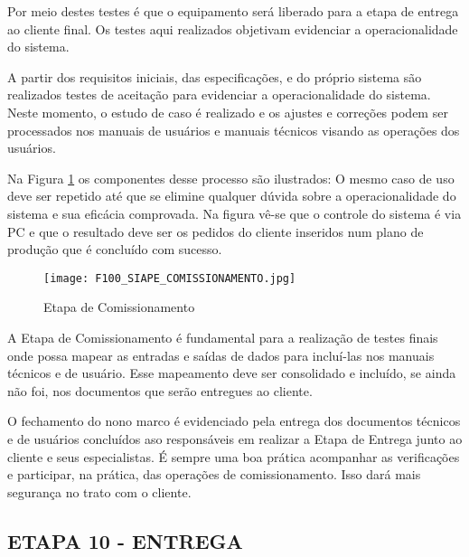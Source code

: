 Por meio destes testes é que o equipamento será liberado para a etapa de entrega ao cliente final. Os testes aqui realizados objetivam evidenciar a operacionalidade do sistema. \par
A partir dos requisitos iniciais, das especificações, e do próprio sistema são realizados testes de aceitação para evidenciar a operacionalidade do sistema. Neste momento, o estudo de caso é realizado e os ajustes e correções podem ser processados nos manuais de usuários e manuais técnicos visando as operações dos usuários.    

Na Figura \ref{F100} os componentes desse processo são ilustrados: O mesmo caso de uso deve ser repetido até que se elimine qualquer dúvida sobre a operacionalidade do sistema e sua eficácia comprovada. Na figura vê-se que o controle do sistema é via PC e que o resultado deve ser os pedidos do cliente inseridos num plano de produção que é concluído com sucesso. 

\begin{figure}[h]
	\centering
	\texttt{[image: F100\_SIAPE\_COMISSIONAMENTO.jpg]} 
	\caption{Etapa de Comissionamento}
	\label{F100}
\end{figure}

A Etapa de Comissionamento é fundamental para a realização de testes finais onde possa mapear as entradas e saídas de dados para incluí-las nos manuais técnicos  e de usuário. Esse mapeamento deve ser consolidado e incluído, se ainda não foi, nos documentos que serão entregues ao cliente. \par 
O fechamento do nono marco é evidenciado pela entrega dos documentos técnicos e de usuários concluídos aso responsáveis em realizar a Etapa de Entrega junto ao cliente e seus especialistas. É sempre uma boa prática acompanhar as verificações e participar, na prática, das operações de comissionamento. Isso dará mais segurança no trato com o cliente.


\clearpage
\subsection{ETAPA 10 - ENTREGA}

